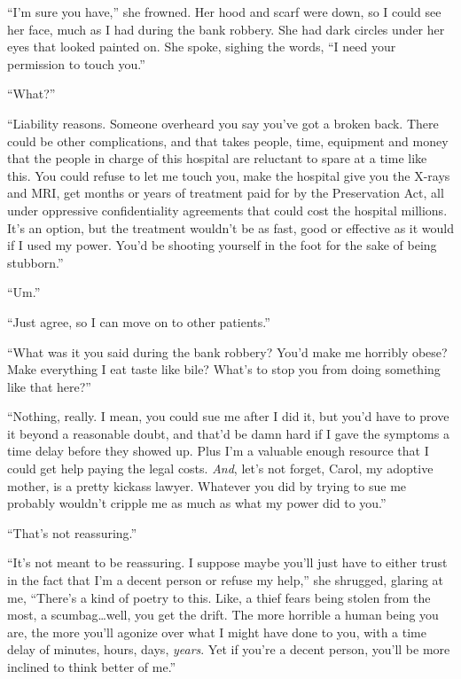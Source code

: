``I'm sure you have,'' she frowned.  Her hood and scarf were down, so I could see her face, much as I had during the bank robbery.  She had dark circles under her eyes that looked painted on.  She spoke, sighing the words, ``I need your permission to touch you.''



``What?''



``Liability reasons.  Someone overheard you say you've got a broken back.  There could be other complications, and that takes people, time, equipment and money that the people in charge of this hospital are reluctant to spare at a time like this.  You could refuse to let me touch you, make the hospital give you the X-rays and MRI, get months or years of treatment paid for by the Preservation Act, all under oppressive confidentiality agreements that could cost the hospital millions.  It's an option, but the treatment wouldn't be as fast, good or effective as it would if I used my power.  You'd be shooting yourself in the foot for the sake of being stubborn.''



``Um.''



``Just agree, so I can move on to other patients.''



``What was it you said during the bank robbery?  You'd make me horribly obese?  Make everything I eat taste like bile?  What's to stop you from doing something like that here?''



``Nothing, really.  I mean, you could sue me after I did it, but you'd have to prove it beyond a reasonable doubt, and that'd be damn hard if I gave the symptoms a time delay before they showed up.  Plus I'm a valuable enough resource that I could get help paying the legal costs.  \emph{And}, let's not forget, Carol, my adoptive mother, is a pretty kickass lawyer.  Whatever you did by trying to sue me probably wouldn't cripple me as much as what my power did to you.''



``That's not reassuring.''



``It's not meant to be reassuring.  I suppose maybe you'll just have to either trust in the fact that I'm a decent person or refuse my help,'' she shrugged, glaring at me, ``There's a kind of poetry to this.  Like, a thief fears being stolen from the most, a scumbag\ldots well, you get the drift.  The more horrible a human being you are, the more you'll agonize over what I might have done to you, with a time delay of minutes, hours, days, \emph{years}.  Yet if you're a decent person, you'll be more inclined to think better of me.''



